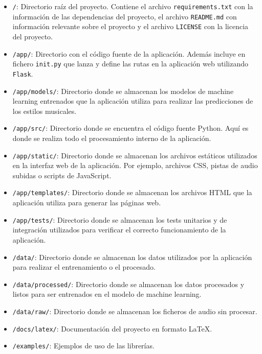 \begin{itemize}
\tightlist

\item \texttt{/}: Directorio raíz del proyecto. Contiene el archivo \texttt{requirements.txt} con la información de las dependencias del proyecto, el archivo \texttt{README.md} con información relevante sobre el proyecto y el archivo \texttt{LICENSE} con la licencia del proyecto.

\item \texttt{/app/}: Directorio con el código fuente de la aplicación. Además incluye en fichero \texttt{\textunderscore\textunderscore init\textunderscore\textunderscore .py} que lanza y define las rutas en la aplicación web utilizando \texttt{Flask}.

\item \texttt{/app/models/}: Directorio donde se almacenan los modelos de machine learning entrenados que la aplicación utiliza para realizar las predicciones de los estilos musicales.

\item \texttt{/app/src/}: Directorio donde se encuentra el código fuente Python. Aquí es donde se realiza todo el procesamiento interno de la aplicación.

\item \texttt{/app/static/}: Directorio donde se almacenan los archivos estáticos utilizados en la interfaz web de la aplicación. Por ejemplo, archivos CSS, pistas de audio subidas o scripts de JavaScript.

\item \texttt{/app/templates/}: Directorio donde se almacenan los archivos HTML que la aplicación utiliza para generar las páginas web.

\item \texttt{/app/tests/}: Directorio donde se almacenan los tests unitarios y de integración utilizados para verificar el correcto funcionamiento de la aplicación.

\item \texttt{/data/}: Directorio donde se almacenan los datos utilizados por la aplicación para realizar el entrenamiento o el procesado.

\item \texttt{/data/processed/}: Directorio donde se almacenan los datos procesados y listos para ser entrenados en el modelo de machine learning.

\item \texttt{/data/raw/}: Directorio donde se almacenan los ficheros de audio sin procesar.

\item \texttt{/docs/latex/}: Documentación del proyecto en formato \LaTeX.

\item \texttt{/examples/}: Ejemplos de uso de las librerías.

\end{itemize}


